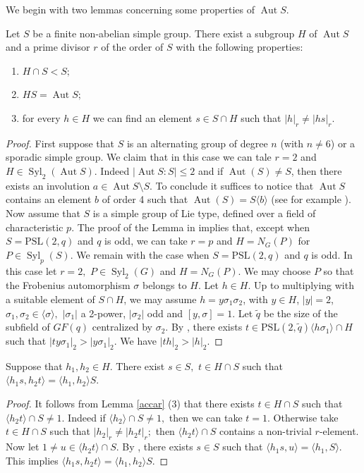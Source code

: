\documentclass{amsart}
\DeclareMathOperator{\aut}{Aut}
\DeclareMathOperator{\syl}{Syl}
\newcommand{\psl}{\mathrm{PSL}}
\numberwithin{equation}{section}
\begin{document}
We begin with two lemmas concerning some properties of $\aut S.$
\begin{lemma}\label{accar}Let $S$ be a finite non-abelian simple group. There exist a subgroup $H$ of $\aut S$ and a prime divisor $r$ of the order of $S$ with the following properties:
	\begin{enumerate}
		\item $H \cap S < S;$
		\item $HS=\aut S;$
		\item for every $h
		\in H$ we can find an element $s \in S\cap H$ such that 
		$|h|_r \neq |h s|_r$.
				\end{enumerate}
\end{lemma}
\begin{proof}
First suppose that $S$ is an alternating group of degree $n$ (with $n\neq 6$) or a sporadic simple group. We claim that in this case we can tale $r=2$ and $H \in \syl_2(\aut S).$ Indeed $|\aut S:S|\leq 2$ and if $\aut(S)	\neq S$, then there exists an involution $a \in \aut S \setminus S.$ To conclude it suffices to notice that $\aut  S$ contains an element $b$ of order 4 such that $\aut(S)=S\langle b \rangle$ (see for example \cite[Theorem 2]{akl}). Now assume that $S$ is a simple group of Lie type, defined over a field of characteristic $p$. The proof of the Lemma in \cite[Section 2]{uni} implies that, except when $S=\psl(2,q)$ and $q$ is odd, we can take $r=p$ and $H=N_G(P)$ for $P \in \syl_p(S).$ We remain with the case when $S=\psl(2,q)$ and $q$ is odd. In this case let $r=2,$ $P\in \syl_2(G)$ and $H=N_G(P).$
We may choose $P$ so that the Frobenius automorphism $\sigma$ belongs to $H.$
Let $h \in H.$ Up to multiplying with a suitable element of $S\cap H$, we may assume $h=y\sigma_1\sigma_2$, with $y \in H$, $|y|=2$,
$\sigma_1,\sigma_2 \in \langle \sigma \rangle,$ $|\sigma_1|$ a 2-power, $|\sigma_2|$ odd and $[y,\sigma]=1.$ Let $\tilde q$ be the size of the subfield of $GF(q)$ centralized by $\sigma_2.$
By \cite[Theorem 2]{akl}, there exists $t \in \psl(2,\tilde q)\langle h\sigma_1\rangle \cap H$ such that $|ty\sigma_1|_2>|y\sigma_1|_2.$ We have $|th|_2>|h|_2.$
\end{proof}
\begin{lemma}\label{spre}
	Suppose that $h_1, h_2\in H.$ There exist $s \in S,$ $t \in H\cap S$ such that $\langle h_1s, h_2t\rangle = \langle h_1, h_2\rangle S.$
\end{lemma}
\begin{proof}
It follows from Lemma \ref{accar} (3) that there exists $t \in H \cap S$ such that $\langle h_2t\rangle \cap S \neq 1.$ Indeed if $\langle h_2\rangle \cap S \neq 1,$ then we can take $t=1.$ Otherwise take $t\in H \cap S$ such that $|h_2|_r \neq |h_2t|_r;$ then $\langle h_2t \rangle \cap S$ contains a non-trivial $r$-element.  Now let $1\neq u \in \langle h_2t \rangle \cap S.$
 By \cite[Theorem 1]{bgh}, there exists $s \in S$ such that $\langle h_1s, u\rangle=\langle h_1, S\rangle.$ This implies 
 $\langle h_1s, h_2t\rangle= \langle h_1, h_2\rangle S.$
\end{proof}
\end{document}
